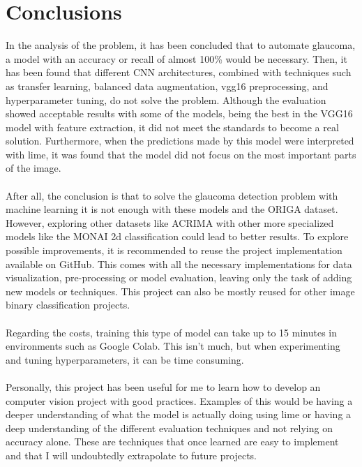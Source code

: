 \documentclass[11pt, a4paper]{article}
\begin{document}
\section{Conclusions}
In the analysis of the problem, it has been concluded that to automate glaucoma, a model with an accuracy or recall of almost 100\% would be necessary. Then, it has been found that different CNN architectures, combined with techniques such as transfer learning, balanced data augmentation, vgg16 preprocessing, and hyperparameter tuning, do not solve the problem. Although the evaluation showed acceptable results with some of the models, being the best in the VGG16 model with feature extraction, it did not meet the standards to become a real solution. Furthermore, when the predictions made by this model were interpreted with lime, it was found that the model did not focus on the most important parts of the image. 
\\\\ After all, the conclusion is that to solve the glaucoma detection problem with machine learning it is not enough with these models and the ORIGA dataset. However, exploring other datasets like ACRIMA with other more specialized models like the MONAI 2d classification could lead to better results. To explore possible improvements, it is recommended to reuse the project implementation available on GitHub. This comes with all the necessary implementations for data visualization, pre-processing or model evaluation, leaving only the task of adding new models or techniques. This project can also be mostly reused for other image binary classification projects.
\\\\
Regarding the costs, training this type of model can take up to 15 minutes in environments such as Google Colab. This isn't much, but when experimenting and tuning hyperparameters, it can be time consuming.
\\\\ Personally, this project has been useful for me to learn how to develop an computer vision project with good practices. Examples of this would be having a deeper understanding of what the model is actually doing using lime or having a deep understanding of the different evaluation techniques and not relying on accuracy alone. These are techniques that once learned are easy to implement and that I will undoubtedly extrapolate to future projects.
\newpage
\end{document}
